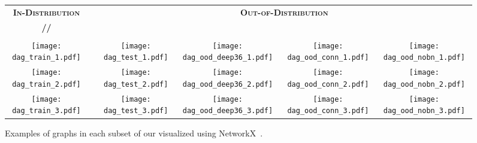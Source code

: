 \begin{figure}[thbp]
	\centering
	\newcommand{\width}{0.19\textwidth}
	\setlength{\tabcolsep}{0pt}
	\begin{tabular}{cp{0.2cm}cccc}
		\toprule
		\multicolumn{1}{c}{{ \textbf{\textsc{In-Distribution}}}} & &
		\multicolumn{4}{c}{{ \textbf{\textsc{Out-of-Distribution}}}}
		\Bstrut\\
		{\small \textbf{\iidtrain/\iidval/\iidtest}} & & {\small \textbf{\wide}} & {\small \textbf{\deep}} & {\small \textbf{\dense}} & {\small \textbf{\bnfree}} \\
		\cline{1-1}\cline{3-6} \\[-2ex]
		\multicolumn{1}{c}{{\texttt{[image: dag\_train\_1.pdf]}}} & & {\texttt{[image: dag\_test\_1.pdf]}} & 
		{\texttt{[image: dag\_ood\_deep36\_1.pdf]}} & 
		\texttt{[image: dag\_ood\_conn\_1.pdf]} & 
		{\texttt{[image: dag\_ood\_nobn\_1.pdf]}}\Bstrut\\
		
		\multicolumn{1}{c}{{\texttt{[image: dag\_train\_2.pdf]}}} & & {\texttt{[image: dag\_test\_2.pdf]}} & 
		{\texttt{[image: dag\_ood\_deep36\_2.pdf]}} & 
		\texttt{[image: dag\_ood\_conn\_2.pdf]} & 
		{\texttt{[image: dag\_ood\_nobn\_2.pdf]}}\Bstrut\\
		
		\multicolumn{1}{c}{{\texttt{[image: dag\_train\_3.pdf]}}} & & {\texttt{[image: dag\_test\_3.pdf]}} & 
		{\texttt{[image: dag\_ood\_deep36\_3.pdf]}} & 
		\texttt{[image: dag\_ood\_conn\_3.pdf]} & 
		{\texttt{[image: dag\_ood\_nobn\_3.pdf]}}\Bstrut\\
		\bottomrule
	\end{tabular}
	\caption{Examples of graphs in each subset of our \dataset visualized using NetworkX~\cite{hagberg2008exploring}.}
	\label{fig:more_examples}
	\vspace{-2pt}
\end{figure}

